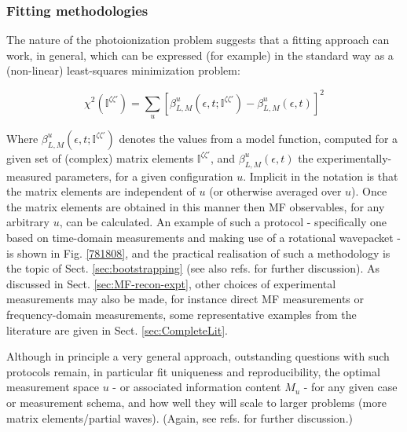 \documentclass[10pt]{article}
\begin{document}
\subsubsection{Fitting methodologies\label{sec:fitting-intro}}

The nature of the photoionization problem suggests that a fitting approach can work, in general, which can be expressed (for example) in the standard way as a (non-linear) least-squares minimization problem:

\begin{equation}
\chi^{2}(\mathbb{I}^{\zeta\zeta'})=\sum_{u}\left[\beta^{u}_{L,M}(\epsilon,t;\mathbb{I}^{\zeta\zeta'})-\beta^{u}_{L,M}(\epsilon,t)\right]^{2}\label{eq:chi2-I}
\end{equation}

Where $\beta^{u}_{L,M}(\epsilon,t;\mathbb{I}^{\zeta\zeta'})$ denotes  the values from a model function, computed for a given set of (complex) matrix elements $\mathbb{I}^{\zeta\zeta'}$, and $\beta^{u}_{L,M}(\epsilon,t)$ the experimentally-measured parameters, for a given configuration $u$. Implicit in the notation is that the matrix elements are independent of $u$ (or otherwise averaged over $u$). Once the matrix elements are obtained in this manner then MF observables, for any arbitrary $u$, can be calculated. An example of such a protocol - specifically one based on time-domain measurements and making use of a rotational wavepacket - is shown in Fig. \ref{781808}, %
and the practical realisation of such a methodology is the topic of Sect. \ref{sec:bootstrapping} (see also refs. \cite{hockett2018QMP2, marceau2017MolecularFrameReconstruction} for further discussion). As discussed in Sect. \ref{sec:MF-recon-expt}, other choices of experimental measurements may also be made, for instance direct MF measurements or frequency-domain measurements, some representative examples from the literature are given in Sect. \ref{sec:CompleteLit}. 

Although in principle a very general approach, outstanding questions with such protocols remain, in particular fit uniqueness and reproducibility, the optimal measurement space $u$ - or associated information content $M_u$ - for any given case or measurement schema, and how well they will scale to larger problems (more matrix elements/partial waves). (Again, see refs. \cite{hockett2018QMP2, marceau2017MolecularFrameReconstruction} for further discussion.)
\end{document}
